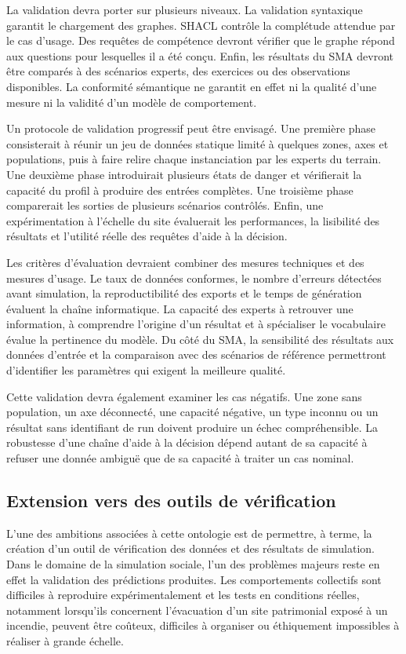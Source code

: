 \documentclass{article}
\begin{document}
La validation devra porter sur plusieurs niveaux. La validation syntaxique garantit le chargement des graphes. SHACL contrôle la complétude attendue par le cas d'usage. Des requêtes de compétence devront vérifier que le graphe répond aux questions pour lesquelles il a été conçu. Enfin, les résultats du SMA devront être comparés à des scénarios experts, des exercices ou des observations disponibles. La conformité sémantique ne garantit en effet ni la qualité d'une mesure ni la validité d'un modèle de comportement.

Un protocole de validation progressif peut être envisagé. Une première phase consisterait à réunir un jeu de données statique limité à quelques zones, axes et populations, puis à faire relire chaque instanciation par les experts du terrain. Une deuxième phase introduirait plusieurs états de danger et vérifierait la capacité du profil à produire des entrées complètes. Une troisième phase comparerait les sorties de plusieurs scénarios contrôlés. Enfin, une expérimentation à l'échelle du site évaluerait les performances, la lisibilité des résultats et l'utilité réelle des requêtes d'aide à la décision.

Les critères d'évaluation devraient combiner des mesures techniques et des mesures d'usage. Le taux de données conformes, le nombre d'erreurs détectées avant simulation, la reproductibilité des exports et le temps de génération évaluent la chaîne informatique. La capacité des experts à retrouver une information, à comprendre l'origine d'un résultat et à spécialiser le vocabulaire évalue la pertinence du modèle. Du côté du SMA, la sensibilité des résultats aux données d'entrée et la comparaison avec des scénarios de référence permettront d'identifier les paramètres qui exigent la meilleure qualité.

Cette validation devra également examiner les cas négatifs. Une zone sans population, un axe déconnecté, une capacité négative, un type inconnu ou un résultat sans identifiant de run doivent produire un échec compréhensible. La robustesse d'une chaîne d'aide à la décision dépend autant de sa capacité à refuser une donnée ambiguë que de sa capacité à traiter un cas nominal.

\subsection{Extension vers des outils de vérification}

L'une des ambitions associées à cette ontologie est de permettre, à terme, la création d'un outil de vérification des données et des résultats de simulation. Dans le domaine de la simulation sociale, l'un des problèmes majeurs reste en effet la validation des prédictions produites. Les comportements collectifs sont difficiles à reproduire expérimentalement et les tests en conditions réelles, notamment lorsqu'ils concernent l'évacuation d'un site patrimonial exposé à un incendie, peuvent être coûteux, difficiles à organiser ou éthiquement impossibles à réaliser à grande échelle.
\end{document}
